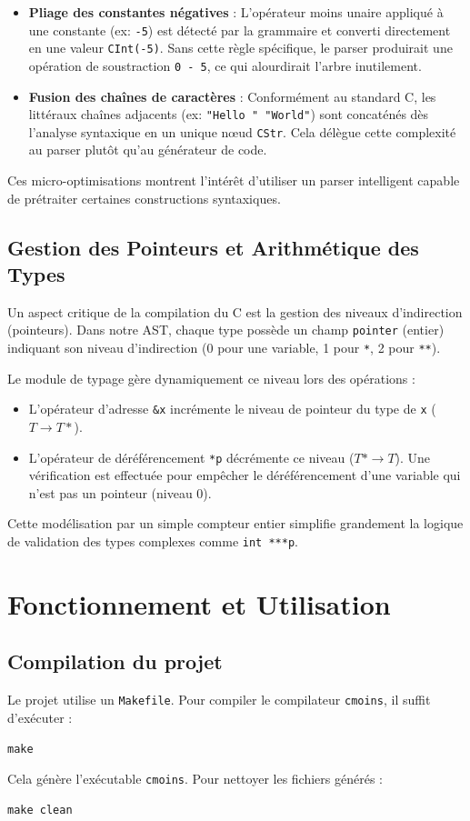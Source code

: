 \documentclass[a4paper,11pt]{article}
\begin{document}
\begin{itemize}
    \item \textbf{Pliage des constantes négatives} : L'opérateur moins unaire appliqué à une constante (ex: \texttt{-5}) est détecté par la grammaire et converti directement en une valeur \texttt{CInt(-5)}. Sans cette règle spécifique, le parser produirait une opération de soustraction \texttt{0 - 5}, ce qui alourdirait l'arbre inutilement.
    \item \textbf{Fusion des chaînes de caractères} : Conformément au standard C, les littéraux chaînes adjacents (ex: \texttt{"Hello " "World"}) sont concaténés dès l'analyse syntaxique en un unique nœud \texttt{CStr}. Cela délègue cette complexité au parser plutôt qu'au générateur de code.
\end{itemize}
Ces micro-optimisations montrent l'intérêt d'utiliser un parser intelligent capable de prétraiter certaines constructions syntaxiques.

\subsection{Gestion des Pointeurs et Arithmétique des Types}
Un aspect critique de la compilation du C est la gestion des niveaux d'indirection (pointeurs).
Dans notre AST, chaque type possède un champ \texttt{pointer} (entier) indiquant son niveau d'indirection (0 pour une variable, 1 pour \texttt{*}, 2 pour \texttt{**}).

Le module de typage gère dynamiquement ce niveau lors des opérations :
\begin{itemize}
    \item L'opérateur d'adresse \texttt{\&x} incrémente le niveau de pointeur du type de \texttt{x} ($T \rightarrow T*$).
    \item L'opérateur de déréférencement \texttt{*p} décrémente ce niveau ($T* \rightarrow T$). Une vérification est effectuée pour empêcher le déréférencement d'une variable qui n'est pas un pointeur (niveau 0).
\end{itemize}
Cette modélisation par un simple compteur entier simplifie grandement la logique de validation des types complexes comme \texttt{int ***p}.

\section{Fonctionnement et Utilisation}

\subsection{Compilation du projet}
Le projet utilise un \texttt{Makefile}. Pour compiler le compilateur \texttt{cmoins}, il suffit d'exécuter :
\begin{verbatim}
make
\end{verbatim}
Cela génère l'exécutable \texttt{cmoins}.
Pour nettoyer les fichiers générés :
\begin{verbatim}
make clean
\end{verbatim}
\end{document}
